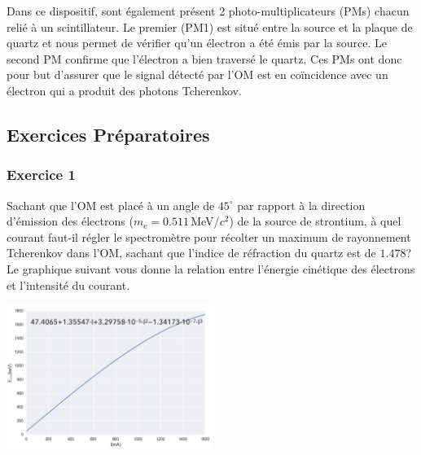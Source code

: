 Dans ce dispositif, sont également présent 2 photo-multiplicateurs (PMs) chacun relié à un scintillateur. Le premier (PM1) est situé entre la source et la plaque de quartz et nous permet de vérifier qu'un électron a été émis par la source. Le second PM confirme que l'électron a bien traversé le quartz. Ces PMs ont donc pour but d'assurer que le signal détecté par l'OM est en coïncidence avec un électron qui a produit des photons Tcherenkov.


\subsection{Exercices Préparatoires}
\subsubsection{Exercice 1}
Sachant que l'OM est placé à un angle de $45^\circ$ par rapport à la direction d'émission des électrons ($m_\mathrm{e} = 0.511$\,MeV/$c^2$) de la source de strontium, à quel courant faut-il régler le spectromètre pour récolter un maximum de rayonnement Tcherenkov dans l'OM, sachant que l'indice de réfraction du quartz est de $1.478$?
Le graphique suivant vous donne la relation entre l'énergie cinétique des électrons et l'intensité du courant.
\begin{center}
	\includegraphics[width=0.5\textwidth]{figures/Relation_Ecin_I.png}
\end{center}


